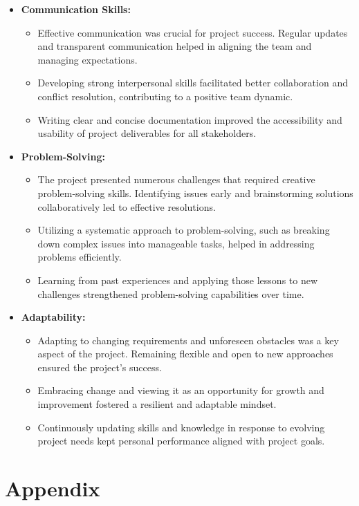\documentclass[11pt,a4paper]{article}
\begin{document}
\begin{itemize}
        \item \textbf{Communication Skills:}
        \begin{itemize}
            \item Effective communication was crucial for project success. Regular updates and transparent communication helped in aligning the team and managing expectations.
            \item Developing strong interpersonal skills facilitated better collaboration and conflict resolution, contributing to a positive team dynamic.
            \item Writing clear and concise documentation improved the accessibility and usability of project deliverables for all stakeholders.
        \end{itemize}

        \item \textbf{Problem-Solving:}
        \begin{itemize}
            \item The project presented numerous challenges that required creative problem-solving skills. Identifying issues early and brainstorming solutions collaboratively led to effective resolutions.
            \item Utilizing a systematic approach to problem-solving, such as breaking down complex issues into manageable tasks, helped in addressing problems efficiently.
            \item Learning from past experiences and applying those lessons to new challenges strengthened problem-solving capabilities over time.
        \end{itemize}

        \item \textbf{Adaptability:}
        \begin{itemize}
            \item Adapting to changing requirements and unforeseen obstacles was a key aspect of the project. Remaining flexible and open to new approaches ensured the project's success.
            \item Embracing change and viewing it as an opportunity for growth and improvement fostered a resilient and adaptable mindset.
            \item Continuously updating skills and knowledge in response to evolving project needs kept personal performance aligned with project goals.
        \end{itemize}
    \end{itemize}


    \newpage
    \appendix
    \section{Appendix}\label{sec:appendix}
\end{document}
